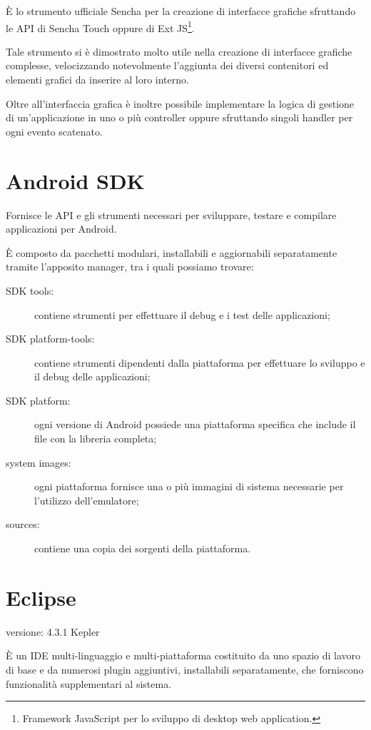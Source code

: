 È lo strumento ufficiale Sencha per la creazione di interfacce grafiche sfruttando le \ac{API} di Sencha Touch oppure di Ext JS\footnote{Framework JavaScript per lo  sviluppo di desktop web application.}.

Tale strumento si è dimostrato molto utile nella creazione di interfacce grafiche complesse, velocizzando notevolmente l'aggiunta dei diversi contenitori ed elementi grafici da inserire al loro interno.

Oltre all'interfaccia grafica è inoltre possibile implementare la logica di gestione di un'applicazione in uno o più controller oppure sfruttando singoli handler per ogni evento scatenato.

\section{Android SDK}
Fornisce le \ac{API} e gli strumenti necessari per sviluppare, testare e compilare applicazioni per Android.

È composto da pacchetti modulari, installabili e aggiornabili separatamente tramite l'apposito manager, tra i quali possiamo trovare:
\begin{description}
\item[SDK tools:] contiene strumenti per effettuare il debug e i test delle applicazioni;
\item[SDK platform-tools:] contiene strumenti dipendenti dalla piattaforma per effettuare lo sviluppo e il debug delle applicazioni;
\item[SDK platform:] ogni versione di Android possiede una piattaforma specifica che include il file  con la libreria completa;
\item[system images:] ogni piattaforma fornisce una o più immagini di sistema necessarie per l'utilizzo dell'emulatore;
\item[sources:] contiene una copia dei sorgenti della piattaforma.
\end{description}

\section{Eclipse}
\begin{description}
\item[versione: 4.3.1 Kepler]
\end{description}

È un \ac{IDE} multi-linguaggio e multi-piattaforma costituito da uno spazio di lavoro di base e da numerosi plugin aggiuntivi, installabili separatamente, che forniscono funzionalità supplementari al sistema.

